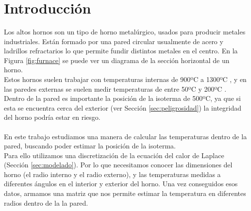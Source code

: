 \documentclass[12pt]{article}
\begin{document}

\fecha{\today}



\maketitle

\tableofcontents

\pagebreak
\section{Introducción}
\label{sec:intro}


\paragraph{} Los altos hornos son un tipo de horno metalúrgico, usados para producir metales industriales. Están formado por una pared circular usualmente de acero y ladrillos refractarios \cite{how.it.works} lo que permite fundir distintos metales en el centro. En la Figura \ref{fig:furnace} se puede ver un diagrama de la sección horizontal de un horno. \\
Estos hornos suelen trabajar con temperaturas internas de 900ºC a 1300ºC \cite{how.it.works}, y en las paredes externas se suelen medir temperaturas de entre 50ºC y 200ºC \cite{consigna}. Dentro de la pared es importante la posición de la isoterma de 500ºC, ya que si esta se encuentra cerca del exterior (ver Sección \ref{sec:peligrosidad}) la integridad del horno podría estar en riesgo.


\paragraph{} En este trabajo estudiamos una manera de calcular las temperaturas dentro de la pared, buscando poder estimar la posición de la isoterma. \\
Para ello utilizamos una discretización de la ecuación del calor de Laplace (Sección \ref{sec:modelado}). Por lo que necesitamos conocer las dimensiones del horno (el radio interno y el radio externo), y las temperaturas medidas a diferentes ángulos en el interior y exterior del horno. Una vez conseguidos esos datos, armamos una matriz que nos permite estimar la temperatura en diferentes radios dentro de la la pared. %
\end{document}
